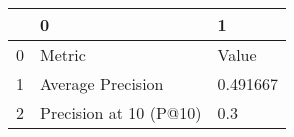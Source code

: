 \begin{tabular}{lll}
\toprule
{} &                       0 &         1 \\
\midrule
0 &                  Metric &     Value \\
1 &       Average Precision &  0.491667 \\
2 &  Precision at 10 (P@10) &       0.3 \\
\bottomrule
\end{tabular}
